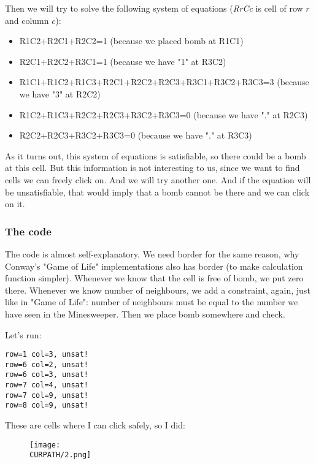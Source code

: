 Then we will try to solve the following system of equations (\textit{RrCc} is cell of row $r$ and column $c$):

\begin{itemize}
\item R1C2+R2C1+R2C2=1                               (because we placed bomb at R1C1)	
\item R2C1+R2C2+R3C1=1                               (because we have "1" at R3C2)	
\item R1C1+R1C2+R1C3+R2C1+R2C2+R2C3+R3C1+R3C2+R3C3=3 (because we have "3" at R2C2)	
\item R1C2+R1C3+R2C2+R2C3+R3C2+R3C3=0                (because we have "." at R2C3)	
\item R2C2+R2C3+R3C2+R3C3=0                          (because we have "." at R3C3)
\end{itemize}

As it turns out, this system of equations is satisfiable, so there could be a bomb at this cell.
But this information is not interesting to us, since we want to find cells we can freely click on.
And we will try another one.
And if the equation will be unsatisfiable, that would imply that a bomb cannot be there and we can click on it.

\subsubsection{The code}



The code is almost self-explanatory.
We need border for the same reason, why Conway's "Game of Life" implementations also has border (to make calculation
function simpler).
Whenever we know that the cell is free of bomb, we put zero there.
Whenever we know number of neighbours, we add a constraint, again, just like in "Game of Life": number of neighbours must be equal to the number we have seen in the Minesweeper.
Then we place bomb somewhere and check.

Let's run:

\begin{lstlisting}
row=1 col=3, unsat!
row=6 col=2, unsat!
row=6 col=3, unsat!
row=7 col=4, unsat!
row=7 col=9, unsat!
row=8 col=9, unsat!
\end{lstlisting}

These are cells where I can click safely, so I did:

\begin{figure}[H]
\centering
\texttt{[image: \\CURPATH/2.png]}
\end{figure}

